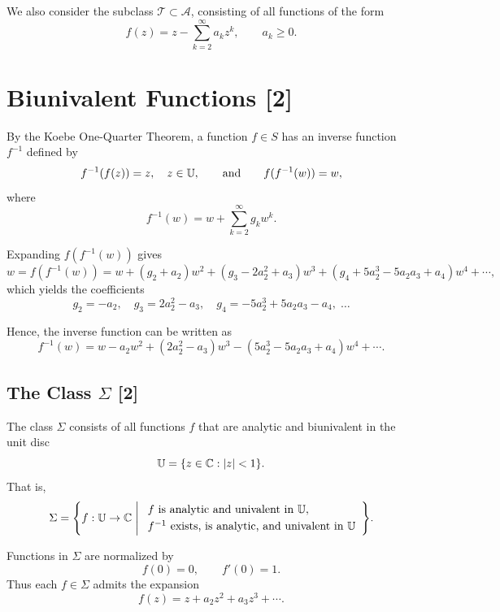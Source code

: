 We also consider the subclass \(\mathcal{T} \subset \mathcal{A}\), consisting of all functions of the form
\[
f(z) = z - \sum_{k=2}^{\infty} a_k z^k,
\qquad
a_k \ge 0.
\]

\section[Biunivalent Functions]{Biunivalent Functions [2]}

By the Koebe One-Quarter Theorem, a function \(f \in S\) has an inverse function \(f^{-1}\) defined by
\begin{equation}\label{eq:inverse-def}
	f^{-1}(f(z)) = z, \quad z \in \mathbb{U}, 
	\qquad \text{and} \qquad 
	f(f^{-1}(w)) = w,
\end{equation}
where
\begin{equation}\label{eq:inverse-expansion}
	f^{-1}(w) = w + \sum_{k=2}^{\infty} g_k w^k.
\end{equation}

Expanding \(f(f^{-1}(w))\) gives
\[
w = f(f^{-1}(w)) = w + (g_2 + a_2) w^2 + (g_3 - 2a_2^2 + a_3) w^3 + (g_4 + 5a_2^3 - 5 a_2 a_3 + a_4) w^4 + \cdots,
\]
which yields the coefficients
\begin{equation}\label{eq:inverse-coeffs}
	g_2 = -a_2, \quad 
	g_3 = 2a_2^2 - a_3, \quad
	g_4 = -5a_2^3 + 5 a_2 a_3 - a_4, \;\dots
\end{equation}

Hence, the inverse function can be written as
\begin{equation}\label{eq:inverse-series}
	f^{-1}(w) = w - a_2 w^2 + (2a_2^2 - a_3) w^3 - (5a_2^3 - 5 a_2 a_3 + a_4) w^4 + \cdots.
\end{equation}

\subsection[The Class \(\Sigma\)]{The Class \(\Sigma\) [2]}

The class \(\Sigma\) consists of all functions \(f\) that are analytic and biunivalent in the unit disc
\[
\mathbb{U} = \{ z \in \mathbb{C} : |z| < 1 \}.
\]
That is,
\[
\Sigma = \Bigg\{ f : \mathbb{U} \to \mathbb{C} \;\Bigg|\;
\begin{array}{l}
	f \text{ is analytic and univalent in } \mathbb{U},\\[1mm]
	f^{-1} \text{ exists, is analytic, and univalent in } \mathbb{U}
\end{array}
\Bigg\}.
\]


Functions in \(\Sigma\) are normalized by
\[
f(0) = 0, \qquad f'(0) = 1.
\]
Thus each \(f \in \Sigma\) admits the expansion
\[
f(z) = z + a_2 z^2 + a_3 z^3 + \cdots.
\]

